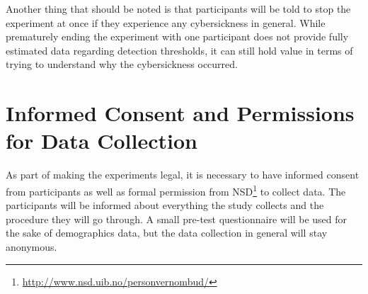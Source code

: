 Another thing that should be noted is that participants will be told to stop the experiment at once if they experience any cybersickness in general. While prematurely ending the experiment with one participant does not provide fully estimated data regarding detection thresholds, it can still hold value in terms of trying to understand why the cybersickness occurred. 

\section{Informed Consent and Permissions for Data Collection}
As part of making the experiments legal, it is necessary to have informed consent from participants as well as formal permission from NSD\footnote{\url{http://www.nsd.uib.no/personvernombud/}} to collect data. The participants will be informed about everything the study collects and the procedure they will go through. A small pre-test questionnaire will be used for the sake of demographics data, but the data collection in general will stay anonymous.  